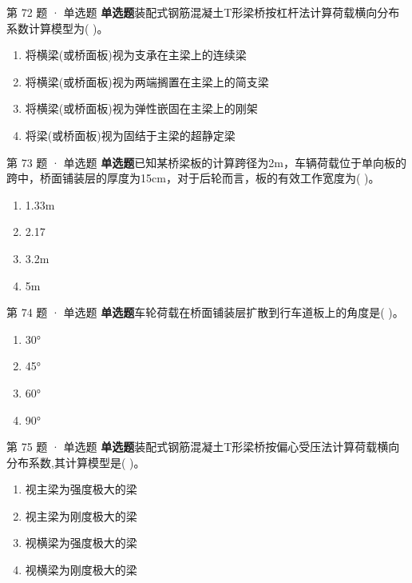 \documentclass[UTF8,zihao=-4,openany]{ctexbook}
\newenvironment{choices}{\begin{enumerate}[label=\Alph*.,leftmargin=9mm,labelsep=3mm,itemsep=2pt,topsep=4pt]}{\end{enumerate}}
\newcommand{\qtype}[1]{\textcolor{brand}{\sffamily\bfseries #1}}
\begin{document}
\begin{questionbox}{第 72 题 · 单选题}
\qtype{单选题}\quad 装配式钢筋混凝土T形梁桥按杠杆法计算荷载横向分布系数计算模型为( )。
\begin{choices}
\item 将横梁(或桥面板)视为支承在主梁上的连续梁
\item 将横梁(或桥面板)视为两端搁置在主梁上的简支梁
\item 将横梁(或桥面板)视为弹性嵌固在主梁上的刚架
\item 将梁(或桥面板)视为固结于主梁的超静定梁
\end{choices}
\end{questionbox}

\begin{questionbox}{第 73 题 · 单选题}
\qtype{单选题}\quad 已知某桥梁板的计算跨径为2m，车辆荷载位于单向板的跨中，桥面铺装层的厚度为15cm，对于后轮而言，板的有效工作宽度为( )。
\begin{choices}
\item 1.33m
\item 2.17
\item 3.2m
\item 5m
\end{choices}
\end{questionbox}

\begin{questionbox}{第 74 题 · 单选题}
\qtype{单选题}\quad 车轮荷载在桥面铺装层扩散到行车道板上的角度是( )。
\begin{choices}
\item 30°
\item 45°
\item 60°
\item 90°
\end{choices}
\end{questionbox}

\begin{questionbox}{第 75 题 · 单选题}
\qtype{单选题}\quad 装配式钢筋混凝土T形梁桥按偏心受压法计算荷载横向分布系数,其计算模型是( )。
\begin{choices}
\item 视主梁为强度极大的梁
\item 视主梁为刚度极大的梁
\item 视横梁为强度极大的梁
\item 视横梁为刚度极大的梁
\end{choices}
\end{questionbox}
\end{document}
